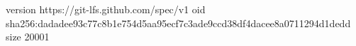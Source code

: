 version https://git-lfs.github.com/spec/v1
oid sha256:dadadee93c77c8b1e754d5aa95ecf7c3ade9ccd38df4dacee8a0711294d1dedd
size 20001
